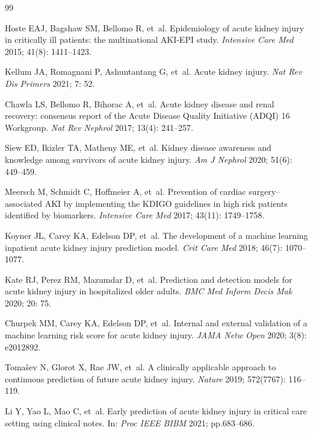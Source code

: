 \documentclass[12pt]{article}
\begin{document}

\begin{thebibliography}{99}

Hoste EAJ, Bagshaw SM, Bellomo R, et~al.
Epidemiology of acute kidney injury in critically ill patients:
the multinational AKI-EPI study.
\textit{Intensive Care Med} 2015; 41(8): 1411--1423.

Kellum JA, Romagnani P, Ashuntantang G, et~al.
Acute kidney injury.
\textit{Nat Rev Dis Primers} 2021; 7: 52.

Chawla LS, Bellomo R, Bihorac A, et~al.
Acute kidney disease and renal recovery: consensus report of
the Acute Disease Quality Initiative (ADQI) 16 Workgroup.
\textit{Nat Rev Nephrol} 2017; 13(4): 241--257.

Siew ED, Ikizler TA, Matheny ME, et~al.
Kidney disease awareness and knowledge among survivors of
acute kidney injury.
\textit{Am J Nephrol} 2020; 51(6): 449--459.

Meersch M, Schmidt C, Hoffmeier A, et~al.
Prevention of cardiac surgery--associated AKI by implementing
the KDIGO guidelines in high risk patients identified by
biomarkers.
\textit{Intensive Care Med} 2017; 43(11): 1749--1758.

Koyner JL, Carey KA, Edelson DP, et~al.
The development of a machine learning inpatient acute kidney
injury prediction model.
\textit{Crit Care Med} 2018; 46(7): 1070--1077.

Kate RJ, Perez RM, Mazumdar D, et~al.
Prediction and detection models for acute kidney injury in
hospitalized older adults.
\textit{BMC Med Inform Decis Mak} 2020; 20: 75.

Churpek MM, Carey KA, Edelson DP, et~al.
Internal and external validation of a machine learning risk
score for acute kidney injury.
\textit{JAMA Netw Open} 2020; 3(8): e2012892.

Toma\v{s}ev N, Glorot X, Rae JW, et~al.
A clinically applicable approach to continuous prediction of
future acute kidney injury.
\textit{Nature} 2019; 572(7767): 116--119.

Li Y, Yao L, Mao C, et~al.
Early prediction of acute kidney injury in critical care
setting using clinical notes.
In: \textit{Proc IEEE BIBM} 2021; pp.683--686.


\end{thebibliography}
\end{document}
